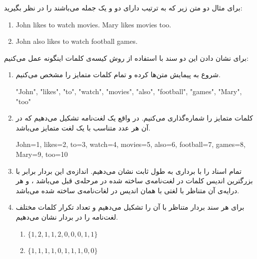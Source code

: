 برای مثال دو متن زیر که به ترتیب دارای دو و یک جمله می‌باشند را در نظر بگیرید:


\begin{latin}
\begin{enumerate}
	\item John likes to watch movies. Mary likes movies too.
	\item John also likes to watch football games.
\end{enumerate}
\end{latin}
\vspace{-0.4cm}

برای نشان دادن این دو سند با استفاده از روش کیسه‌ی‌ کلمات اینگونه عمل می‌‌کنیم:
\vspace{-0.4cm}
\begin{enumerate}
	
	\item  شروع به پیمایش متن‌ها کرده و تمام کلمات متمایز را مشخص می‌کنیم.
	\vspace{0.1cm}
	\begin{latin}
		"John", "likes", "to", "watch", "movies", "also", "football", "games", "Mary", "too"
	\end{latin}
	\vspace{-0.4cm}
	
	\item کلمات متمایز را شماره‌گذاری می‌‌کنیم. در واقع یک لغت‌نامه تشکیل می‌‌دهیم که در آن هر عدد متناسب با یک لغت متمایز می‌‌باشد.
	\vspace{0.1cm}
	\begin{latin}
		John=1, likes=2, to=3, watch=4, movies=5, also=6, football=7, games=8, Mary=9, too=10
	\end{latin}
	\vspace{-0.4cm}
	
	\item تمام اسناد را با برداری به طول ثابت نشان می‌‌دهیم. اندازه‌ی  این بردار برابر با بزرگترین اندیس کلمات در لغت‌نامه‌ی ساخته شده در مرحله‌ی قبل می‌‌باشد ، و هر درایه‌ی آن متناظر با لغتی با همان اندیس در لغات‌نامه‌ی ساخته شده می‌‌باشد.
	
	\item برای هر سند بردار متناظر با آن را تشکیل می‌‌دهیم و تعداد تکرار کلمات مختلف لغت‌نامه را در بردار نشان می‌‌دهیم.
	\vspace{0.1cm}
	\begin{latin}
		\begin{enumerate}
			\item $\{1, 2, 1, 1, 2, 0, 0, 0, 1, 1\}$
			\item $\{1, 1, 1, 1, 0, 1, 1, 1, 0, 0\}$
		\end{enumerate}
	\end{latin}
	\vspace{-0.4cm}
		
\end{enumerate}

